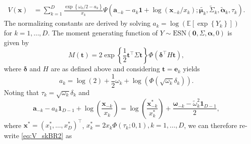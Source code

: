 \documentclass[12pt]{article}
\begin{document}
%
\begin{align}
\label{eq:V_skBR2}
V(\bm x) &= \sum_{k=1}^D \frac{\exp\left\{\omega_k/2-a_k\right\}}{x_k}
\Psi \left( \bm a_{-k}-a_{k} \bm 1 + \log(\bm x_{-k}/x_k) ; \tilde{\bm \mu_k}, \tilde\Sigma_k, \tilde{\bm \alpha}_k, \tau_k\right).
\end{align}
% 
The normalizing constants are derived by solving $a_k = \log\left( \mathbb{E} \left[ \exp \left\{ Y_k\right\}\right]\right)$ for $k=1, \ldots, D$. The moment generating function of $Y \sim \text{ESN}(\bm 0, \Sigma, \bm \alpha, 0)$ is given by
%
$$
M(\bm t)  = 2 \exp \left\{ \frac{1}{2} \bm t^\top \Sigma \bm t \right\} \Phi\left( \bm \delta^\top H \bm t\right),
$$
%
where $\bm \delta$ and $H$ are as defined above and considering $\bm t = \bm e_k$ yields 
%
$$
a_k = \log(2) + \frac{1}{2} \omega_k + \log \left( \Phi\left( \sqrt{\omega_k}\delta_k \right)\right).
$$
Noting that $\tau_k = \sqrt{\omega_k}\delta_k$ and
%
$$
\bm a_{-k}-a_{k} \bm 1_{D-1}+\log \left(\frac{\bm x_{-k}}{x_k}\right)
= \log \left( \frac{\bm x^*_{-k}}{x^*_k} \right) + \frac{\bm\omega_{-k} - \tilde{\omega}_k^2\bm 1_{D-1}}{2},
$$
where $\bm x^* = \left( x^*_1, \ldots, x^*_D\right)^\top$, $x^*_k = 2x_k \Phi\left( \tau_k; 0, 1 \right), k=1, \ldots, D$,
we can therefore re-write \eqref{eq:V_skBR2} as
%
\end{document}
